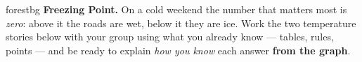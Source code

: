\documentclass[12pt]{article}
\begin{document}

\vspace{0.06in}

\begin{headlinebox}{forestbg}
\textbf{Freezing Point.} On a cold weekend the number that matters most is \emph{zero}: above it the
roads are wet, below it they are ice. Work the two temperature stories below with your group using
what you already know --- tables, rules, points --- and be ready to explain \emph{how you know} each
answer \textbf{from the graph}.
\end{headlinebox}

\vspace{0.04in}

\end{document}
